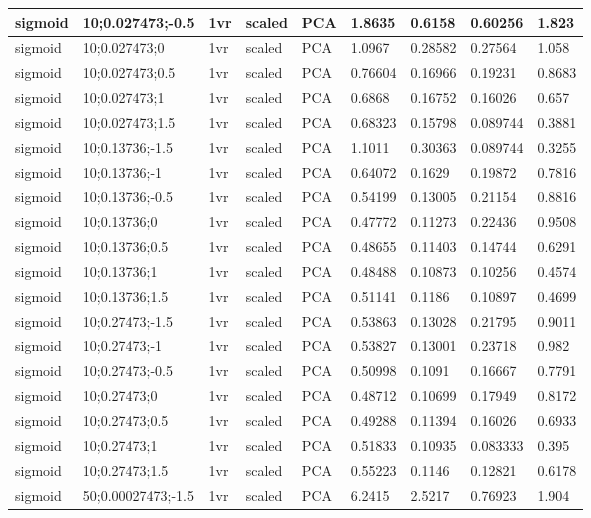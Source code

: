 \begin{longtable}{lllllllll}
sigmoid & 10;0.027473;-0.5 & 1vr & scaled & PCA & 1.8635 & 0.6158 & 0.60256 & 1.823\\ \hline
sigmoid & 10;0.027473;0 & 1vr & scaled & PCA & 1.0967 & 0.28582 & 0.27564 & 1.058\\ \hline
sigmoid & 10;0.027473;0.5 & 1vr & scaled & PCA & 0.76604 & 0.16966 & 0.19231 & 0.8683\\ \hline
sigmoid & 10;0.027473;1 & 1vr & scaled & PCA & 0.6868 & 0.16752 & 0.16026 & 0.657\\ \hline
sigmoid & 10;0.027473;1.5 & 1vr & scaled & PCA & 0.68323 & 0.15798 & 0.089744 & 0.3881\\ \hline
sigmoid & 10;0.13736;-1.5 & 1vr & scaled & PCA & 1.1011 & 0.30363 & 0.089744 & 0.3255\\ \hline
sigmoid & 10;0.13736;-1 & 1vr & scaled & PCA & 0.64072 & 0.1629 & 0.19872 & 0.7816\\ \hline
sigmoid & 10;0.13736;-0.5 & 1vr & scaled & PCA & 0.54199 & 0.13005 & 0.21154 & 0.8816\\ \hline
sigmoid & 10;0.13736;0 & 1vr & scaled & PCA & 0.47772 & 0.11273 & 0.22436 & 0.9508\\ \hline
sigmoid & 10;0.13736;0.5 & 1vr & scaled & PCA & 0.48655 & 0.11403 & 0.14744 & 0.6291\\ \hline
sigmoid & 10;0.13736;1 & 1vr & scaled & PCA & 0.48488 & 0.10873 & 0.10256 & 0.4574\\ \hline
sigmoid & 10;0.13736;1.5 & 1vr & scaled & PCA & 0.51141 & 0.1186 & 0.10897 & 0.4699\\ \hline
sigmoid & 10;0.27473;-1.5 & 1vr & scaled & PCA & 0.53863 & 0.13028 & 0.21795 & 0.9011\\ \hline
sigmoid & 10;0.27473;-1 & 1vr & scaled & PCA & 0.53827 & 0.13001 & 0.23718 & 0.982\\ \hline
sigmoid & 10;0.27473;-0.5 & 1vr & scaled & PCA & 0.50998 & 0.1091 & 0.16667 & 0.7791\\ \hline
sigmoid & 10;0.27473;0 & 1vr & scaled & PCA & 0.48712 & 0.10699 & 0.17949 & 0.8172\\ \hline
sigmoid & 10;0.27473;0.5 & 1vr & scaled & PCA & 0.49288 & 0.11394 & 0.16026 & 0.6933\\ \hline
sigmoid & 10;0.27473;1 & 1vr & scaled & PCA & 0.51833 & 0.10935 & 0.083333 & 0.395\\ \hline
sigmoid & 10;0.27473;1.5 & 1vr & scaled & PCA & 0.55223 & 0.1146 & 0.12821 & 0.6178\\ \hline
sigmoid & 50;0.00027473;-1.5 & 1vr & scaled & PCA & 6.2415 & 2.5217 & 0.76923 & 1.904\\ \hline

\end{longtable}

